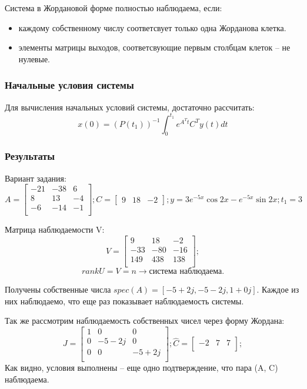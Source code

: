 Система в Жордановой форме полностью наблюдаема, если:
\begin{itemize}
    \item каждому собственному числу соответсвует только одна Жорданова клетка. 
    \item элементы матрицы выходов, соответсвующие первым столбцам клеток -- не нулевые.
\end{itemize}

\subsubsection{Начальные условия системы}
Для вычисления начальных условий системы, достаточно рассчитать:
\[x(0) = (P(t_1))^{-1} \int_{0}^{t_1} e^{A^T t} C^T y(t) dt\]


\subsubsection{Результаты}
Вариант задания:
\[ A = \begin{bmatrix}
        -21 & -38 & 6 \\
        8 & 13 & -4 \\
        -6 & -14 & -1 \\
        \end{bmatrix}; 
        C = \begin{bmatrix}
                9  & 18 & -2
                \end{bmatrix}; 
        y = 3 e^{-5x}\cos{2x} - e^{-5x}\sin{2x}; 
        t_1 = 3
\]

Матрица наблюдаемости V:
\[ V = \begin{bmatrix}
        9 & 18 & -2 \\
        -33 & -80 & -16 \\
        149 & 438 & 138 \\
        \end{bmatrix};
\]
\[rankU = V = n \rightarrow \text{система наблюдаема.}\]

Получены собственные числа \(spec(A) = [-5 + 2j, -5 - 2j, 1+0j]\). Каждое из них наблюдаемо, что еще раз показывает наблюдаемость системы.

Так же рассмотрим наблюдаемость собственных чисел через форму Жордана:
\[
        J = \begin{bmatrix}
                1 & 0 & 0 \\
                0 & -5 - 2j & 0 \\
                0 & 0 & -5 + 2j \\
                \end{bmatrix};
        \hat{C} = \begin{bmatrix}
                -2 &
                7 &
                7 \\
                \end{bmatrix};
\]
Как видно, условия выполнены -- еще одно подтверждение, что пара (A, C) наблюдаема.


